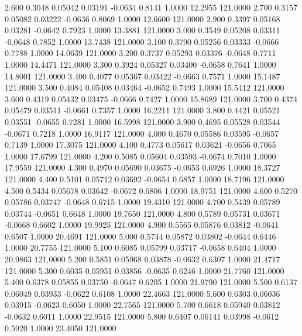    2.600   0.3048   0.05042   0.03191  -0.0634   0.8141   1.0000  12.2955 121.0000
   2.700   0.3157   0.05082   0.03222  -0.0636   0.8069   1.0000  12.6600 121.0000
   2.900   0.3397   0.05168   0.03281  -0.0642   0.7923   1.0000  13.3881 121.0000
   3.000   0.3549   0.05208   0.03311  -0.0648   0.7852   1.0000  13.7438 121.0000
   3.100   0.3790   0.05256   0.03333  -0.0666   0.7788   1.0000  14.0639 121.0000
   3.200   0.3737   0.05293   0.03376  -0.0648   0.7711   1.0000  14.4471 121.0000
   3.300   0.3924   0.05327   0.03400  -0.0658   0.7641   1.0000  14.8001 121.0000
   3.400   0.4077   0.05367   0.03422  -0.0663   0.7571   1.0000  15.1487 121.0000
   3.500   0.4084   0.05408   0.03464  -0.0652   0.7493   1.0000  15.5412 121.0000
   3.600   0.4319   0.05432   0.03475  -0.0666   0.7427   1.0000  15.8689 121.0000
   3.700   0.4374   0.05479   0.03511  -0.0661   0.7357   1.0000  16.2211 121.0000
   3.800   0.4421   0.05521   0.03551  -0.0655   0.7281   1.0000  16.5998 121.0000
   3.900   0.4695   0.05528   0.03544  -0.0671   0.7218   1.0000  16.9117 121.0000
   4.000   0.4670   0.05586   0.03595  -0.0657   0.7139   1.0000  17.3075 121.0000
   4.100   0.4773   0.05617   0.03621  -0.0656   0.7065   1.0000  17.6799 121.0000
   4.200   0.5085   0.05604   0.03593  -0.0674   0.7010   1.0000  17.9559 121.0000
   4.300   0.4970   0.05690   0.03675  -0.0653   0.6926   1.0000  18.3727 121.0000
   4.400   0.5101   0.05712   0.03692  -0.0654   0.6857   1.0000  18.7196 121.0000
   4.500   0.5434   0.05678   0.03642  -0.0672   0.6806   1.0000  18.9751 121.0000
   4.600   0.5270   0.05786   0.03747  -0.0648   0.6715   1.0000  19.4310 121.0000
   4.700   0.5439   0.05789   0.03744  -0.0651   0.6648   1.0000  19.7650 121.0000
   4.800   0.5789   0.05731   0.03671  -0.0668   0.6602   1.0000  19.9925 121.0000
   4.900   0.5565   0.05876   0.03812  -0.0641   0.6507   1.0000  20.4691 121.0000
   5.000   0.5744   0.05872   0.03802  -0.0644   0.6446   1.0000  20.7755 121.0000
   5.100   0.6085   0.05799   0.03717  -0.0658   0.6404   1.0000  20.9863 121.0000
   5.200   0.5851   0.05968   0.03878  -0.0632   0.6307   1.0000  21.4717 121.0000
   5.300   0.6035   0.05951   0.03856  -0.0635   0.6246   1.0000  21.7760 121.0000
   5.400   0.6378   0.05855   0.03750  -0.0647   0.6205   1.0000  21.9790 121.0000
   5.500   0.6137   0.06049   0.03933  -0.0622   0.6108   1.0000  22.4663 121.0000
   5.600   0.6303   0.06036   0.03915  -0.0623   0.6050   1.0000  22.7565 121.0000
   5.700   0.6618   0.05940   0.03812  -0.0632   0.6011   1.0000  22.9515 121.0000
   5.800   0.6407   0.06141   0.03998  -0.0612   0.5920   1.0000  23.4050 121.0000
